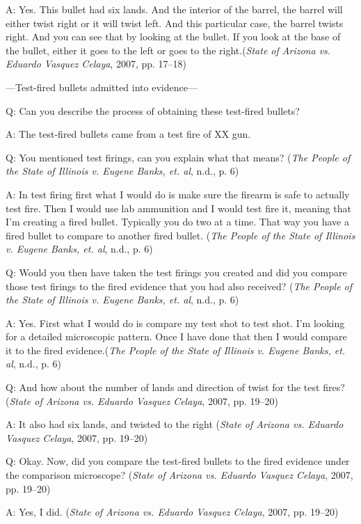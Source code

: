 \documentclass[print]{nuthesis}
\begin{document}
A: Yes. This bullet had six lands. And the interior of the barrel, the barrel will either twist right or it will twist left.
And this particular case, the barrel twists right.
And you can see that by looking at the bullet.
If you look at the base of the bullet, either it goes to the left or goes to the right.(\emph{State of {Arizona} vs. Eduardo {Vasquez} {Celaya}}, 2007, pp. 17--18)

---Test-fired bullets admitted into evidence---

Q: Can you describe the process of obtaining these test-fired bullets?

A: The test-fired bullets came from a test fire of XX gun.

Q: You mentioned test firings, can you explain what that means? (\emph{The {People} of the {State} of {Illinois} v. Eugene {Banks}, et. al}, n.d., p. 6)

A: In test firing first what I would do is make sure the firearm is safe to actually test fire.
Then I would use lab ammunition and I would test fire it, meaning that I'm creating a fired bullet.
Typically you do two at a time.
That way you have a fired bullet to compare to another fired bullet. (\emph{The {People} of the {State} of {Illinois} v. Eugene {Banks}, et. al}, n.d., p. 6)

Q: Would you then have taken the test firings you created and did you compare those test firings to the fired evidence that you had also received? (\emph{The {People} of the {State} of {Illinois} v. Eugene {Banks}, et. al}, n.d., p. 6)

A: Yes. First what I would do is compare my test shot to test shot.
I'm looking for a detailed microscopic pattern.
Once I have done that then I would compare it to the fired evidence.(\emph{The {People} of the {State} of {Illinois} v. Eugene {Banks}, et. al}, n.d., p. 6)

Q: And how about the number of lands and direction of twist for the test fires? (\emph{State of {Arizona} vs. Eduardo {Vasquez} {Celaya}}, 2007, pp. 19--20)

A: It also had six lands, and twisted to the right (\emph{State of {Arizona} vs. Eduardo {Vasquez} {Celaya}}, 2007, pp. 19--20)

Q: Okay. Now, did you compare the test-fired bullets to the fired evidence under the comparison microscope? (\emph{State of {Arizona} vs. Eduardo {Vasquez} {Celaya}}, 2007, pp. 19--20)

A: Yes, I did. (\emph{State of {Arizona} vs. Eduardo {Vasquez} {Celaya}}, 2007, pp. 19--20)
\end{document}

